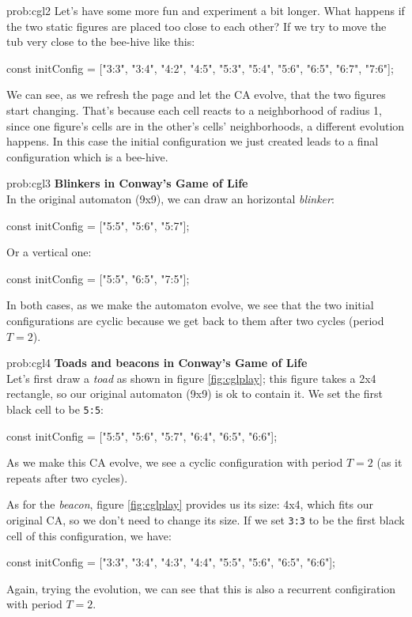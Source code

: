 \begin{sol}{prob:cgl2}
Let's have some more fun and experiment a bit longer. What happens if the two static figures
are placed too close to each other? If we try to move the tub very close to the bee-hive like this:
\begin{code}
const initConfig = ["3:3", "3:4", "4:2", "4:5", "5:3", "5:4", "5:6", "6:5", "6:7", "7:6"];
\end{code}
We can see, as we refresh the page and let the CA evolve, that the two figures start changing.
That's because each cell reacts to a neighborhood of radius 1, since one figure's cells are
in the other's cells' neighborhoods, a different evolution happens. In this case the initial configuration
we just created leads to a final configuration which is a bee-hive.
\end{sol}

\begin{sol}{prob:cgl3}
\textbf{Blinkers in Conway's Game of Life}\\
In the original automaton (9x9), we can draw an horizontal \textit{blinker}:
\begin{code}
const initConfig = ["5:5", "5:6", "5:7"];
\end{code}
Or a vertical one:
\begin{code}
const initConfig = ["5:5", "6:5", "7:5"];
\end{code}
In both cases, as we make the automaton evolve, we see that the two initial configurations are
cyclic because we get back to them after two cycles (period $T=2$).
\end{sol}

\begin{sol}{prob:cgl4}
\textbf{Toads and beacons in Conway's Game of Life}\\
Let's first draw a \textit{toad} as shown in figure \ref{fig:cglplay};
this figure takes a 2x4 rectangle, so our original automaton (9x9)
is ok to contain it. We set the first black cell to be \texttt{5:5}:
\begin{code}
const initConfig = ["5:5", "5:6", "5:7", "6:4", "6:5", "6:6"];
\end{code}
As we make this CA evolve, we see a cyclic configuration with period $T=2$
(as it repeats after two cycles).

As for the \textit{beacon}, figure \ref{fig:cglplay} provides us its size: 4x4, which fits
our original CA, so we don't need to change its size. If we set \texttt{3:3} to be the first black
cell of this configuration, we have:
\begin{code}
const initConfig = ["3:3", "3:4", "4:3", "4:4", "5:5", "5:6", "6:5", "6:6"];
\end{code}
Again, trying the evolution, we can see that this is also a recurrent configiration with period $T=2$.
\end{sol}

